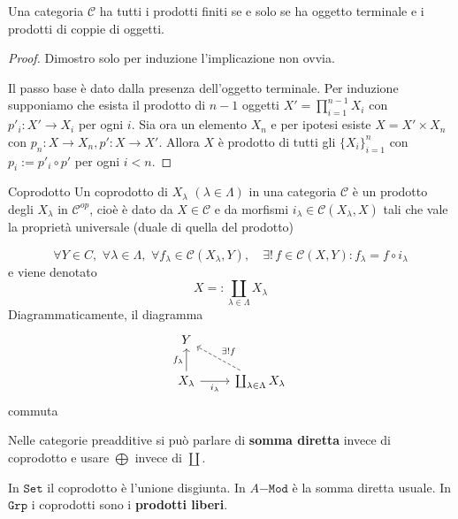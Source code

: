 \begin{proposition}{}
    Una categoria \(\mathcal{C}\) ha tutti i prodotti finiti se e solo se ha
    oggetto terminale e i prodotti di coppie di oggetti.
\end{proposition}
\begin{proof}{}
    Dimostro solo per induzione l'implicazione non ovvia.

    Il passo base è dato dalla presenza dell'oggetto terminale.
    Per induzione supponiamo che esista
    il prodotto di \(n-1\) oggetti \(X'=\prod_{i = 1}^{n-1} X_i\) con \(p'_i :
    X' \to X_{i}\) per ogni \(i\). Sia ora un elemento \(X_n\) e per ipotesi
    esiste \(X = X' \times X_{n}\) con \(p_{n} : X \to X_{n}, p' : X \to X'\).
    Allora \(X\) è prodotto di tutti gli \(\{X_i\}_{i=1}^{n}\) con \(p_{i} :=
    p'_i \circ p'\) per ogni \(i < n\). 
\end{proof}

\begin{definition}{Coprodotto}
    Un coprodotto di \(X_\lambda\) \((\lambda \in \Lambda)\) in una categoria \(\mathcal{C}\) è un prodotto degli \(X_\lambda\) in \(\mathcal{C}^{op}\), cioè è dato da \(
    X \in \mathcal{C}\) e da morfismi \(i_\lambda \in \mathcal{C}{(X_\lambda, X)}\) tali che vale la proprietà universale (duale di quella del prodotto)

\[
  \forall Y \in C, \,\, \forall \lambda \in \Lambda,\,\, \forall f_\lambda \in \mathcal{C}{(X_\lambda, Y)}, \quad \exists ! \,f \in \mathcal{C}{(X, Y)} : f_\lambda = f \circ i_\lambda
\]
e viene denotato 
\[
  X =: \coprod_{\lambda \in \Lambda} X_\lambda
\]
Diagrammaticamente, il diagramma
\[\begin{tikzcd}
	Y \\
	{X_\lambda} & \coprod_{\lambda \in \Lambda} X_\lambda
	\arrow["{f_\lambda}", from=2-1, to=1-1]
	\arrow["{i_\lambda}"', from=2-1, to=2-2]
	\arrow["{\exists! f}"', dashed, from=2-2, to=1-1]
\end{tikzcd}\]
commuta
\end{definition}

Nelle categorie preadditive si può parlare di \textbf{somma diretta} invece di
coprodotto e usare \(\bigoplus\) invece di \(\coprod\).

\begin{example}{}
    In \(\mathtt{Set}\) il coprodotto è l'unione disgiunta. In \(A\mathtt{-Mod}\) è la somma diretta usuale. In \(\mathtt{Grp}\) i coprodotti sono i \textbf{prodotti liberi}.
\end{example}

